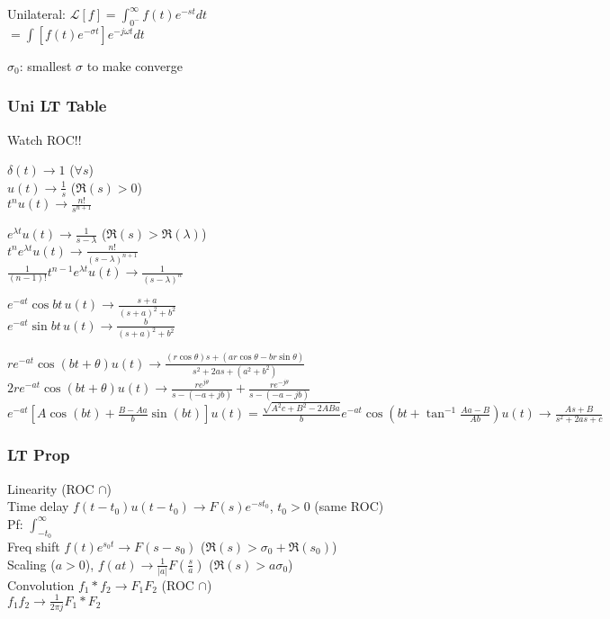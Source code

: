 \documentclass[4pt]{article}
\theoremstyle{definition}
\theoremstyle{definition}
\renewcommand{\o}{\omega}
\newcommand{\ra}{\rightarrow}
\newcommand{\ulint}{\int_{0^-}^{\infty}}    %
\begin{document}
\begin{multicols}{3}
Unilateral: \(\mathcal{L}[f] = \ulint f(t) e^{-st} dt\)\\          %
\(= \int [f(t) e^{-\sigma t}] e^{-j\o t} dt\)


$\sigma_0$: smallest $\sigma$ to make converge
\subsubsection{Uni LT Table}
    Watch ROC!!     %

    $\delta(t) \ra 1$ ($\forall s$)\\
    $u(t) \ra \frac{1}{s}$ ($\Re(s) > 0$)\\
    $t^n u(t) \ra \frac{n!}{s^{n+1}}$               %

    \(e^{\lambda t} u(t) \ra \frac{1}{s-\lambda}\) ($\Re(s) > \Re(\lambda)$)\\        %
    \(t^n e^{\lambda t} u(t) \ra \frac{n!}{(s-\lambda)^{n+1}}\)\\     %
    \(\frac{1}{(n-1)!} t^{n-1} e^{\lambda t} u(t) \ra \frac{1}{(s-\lambda)^n} \)        %

    \(e^{-at} \cos bt\, u(t) \ra \frac{s+a}{(s+a)^2 + b^2}\)\\
    \(e^{-at} \sin bt\, u(t) \ra \frac{b}{(s+a)^2 + b^2}\)    

    \(re^{-at} \cos(bt + \theta) u(t) \ra \frac{(r\cos\theta)s + (ar \cos\theta - br\sin \theta)}{s^2 + 2as + (a^2 + b^2)}\)\\
    \(2re^{-at} \cos(bt + \theta) u(t) \ra \frac{re^{j\theta}}{s-(-a+jb)}+\frac{re^{-j\theta}}{s-(-a-jb)}\)\\
    \(e^{-at}\left[A\cos(b t) + \frac{B-Aa}{b}\sin(bt)\right] u(t) = \frac{\sqrt{A^2c + B^2 - 2ABa}}{b}e^{-at}\cos\left(bt + \tan^{-1}\frac{Aa-B}{Ab}\right) u(t) \ra \frac{As+B}{s^2+2as+c}\)
\subsubsection{LT Prop}
    Linearity (ROC $\cap$)\\
    Time delay \(f(t-t_0) u(t-t_0) \ra F(s) e^{-st_0}\), $t_0 > 0$ (same ROC)\\    %
        Pf: \(\int_{-t_0}^{\infty}\)\\ %
    Freq shift \(f(t) e^{s_0 t} \ra F(s-s_0)\) ($\Re(s) > \sigma_0 + \Re(s_0)$)\\
    Scaling ($a > 0$), \(f(at) \ra \frac{1}{|a|} F(\frac{s}{a})\) ($\Re(s) > a\sigma_0 $)\\   %
    Convolution \(f_1 * f_2 \ra F_1 F_2\) (ROC $\cap$)\\
    \(f_1 f_2 \ra \frac{1}{2\pi j} F_1 * F_2\)


\end{multicols}
\end{document}
